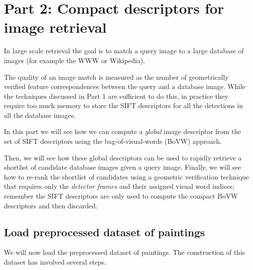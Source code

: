 \documentclass[11pt]{article}
\begin{document}
    \hypertarget{part-2-compact-descriptors-for-image-retrieval}{%
\section{Part 2: Compact descriptors for image
retrieval}\label{part-2-compact-descriptors-for-image-retrieval}}

    In large scale retrieval the goal is to match a query image to a large
database of images (for example the WWW or Wikipedia).

The quality of an image match is measured as the number of geometrically
verified feature correspondences between the query and a database image.
While the techniques discussed in Part 1 are sufficient to do this, in
practice they require too much memory to store the SIFT descriptors for
all the detections in all the database images.

In this part we will see how we can compute a \emph{global} image
descriptor from the set of SIFT descriptors using the
bag-of-visual-words (BoVW) approach.

Then, we will see how these global descriptors can be used to rapidly
retrieve a shortlist of candidate database images given a query image.
Finally, we will see how to re-rank the shortlist of candidates using a
geometric verification technique that requires only the \emph{detector
frames} and their assigned visual word indices; remember the SIFT
descriptors are only used to compute the compact BoVW descriptors and
then discarded.

    \hypertarget{load-preprocessed-dataset-of-paintings}{%
\subsection{Load preprocessed dataset of
paintings}\label{load-preprocessed-dataset-of-paintings}}

    We will now load the preprocessed dataset of paintings. The construction
of this dataset has involved several steps.
\end{document}
